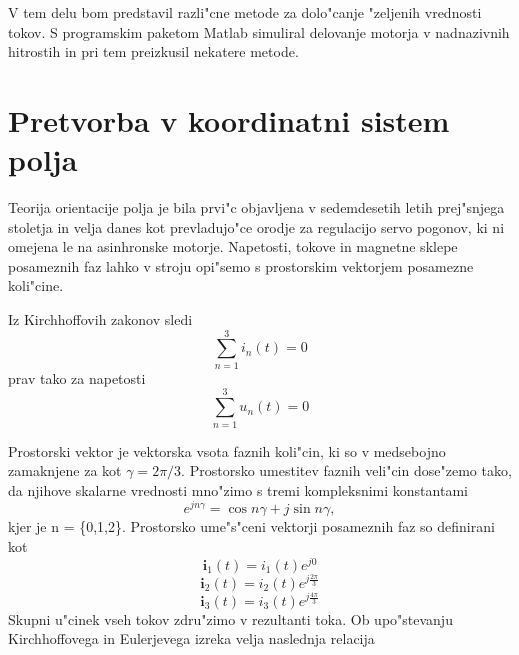 \documentclass[journal,a4paper,twoside]{sty/IEEEtran}
\begin{document}
V tem delu bom predstavil razli"cne metode za dolo"canje "zeljenih vrednosti tokov.
S programskim paketom Matlab simuliral delovanje motorja v nadnazivnih hitrostih in pri tem preizkusil nekatere metode.
\section{Pretvorba v koordinatni sistem polja}

Teorija orientacije polja je bila prvi"c objavljena v sedemdesetih letih prej"snjega stoletja in velja danes kot prevladujo"ce orodje za regulacijo servo pogonov, ki ni omejena le na asinhronske motorje. Napetosti, tokove in magnetne sklepe posameznih faz lahko v stroju opi"semo s prostorskim vektorjem posamezne koli"cine. 

%
Iz Kirchhoffovih zakonov sledi \begin{equation}
\sum_{n=1}^3 i_n(t)=0
\end{equation} prav tako za napetosti \begin{equation}
\sum_{n=1}^3 u_n(t)=0
\end{equation}



Prostorski vektor je vektorska vsota faznih koli"cin, ki so v medsebojno zamaknjene za kot  $\gamma=2 \pi/3$. Prostorsko umestitev faznih veli"cin dose"zemo tako, da njihove skalarne vrednosti mno"zimo s tremi kompleksnimi konstantami$$e^{j n \gamma}=\cos n \gamma +j \sin n \gamma,$$ kjer je n = \{0,1,2\}. Prostorsko ume"s"ceni vektorji posameznih faz so definirani kot
$$\textbf{i}_1(t)=i_1(t) e^{j 0} $$ 
$$\textbf{i}_2(t)=i_2(t) e^{j \frac{2\pi}{3}} $$ 
$$\textbf{i}_3(t)=i_3(t) e^{j \frac{4\pi}{3}} $$
Skupni u"cinek vseh tokov zdru"zimo v rezultanti toka. Ob upo"stevanju Kirchhoffovega in Eulerjevega izreka velja naslednja relacija
\end{document}
